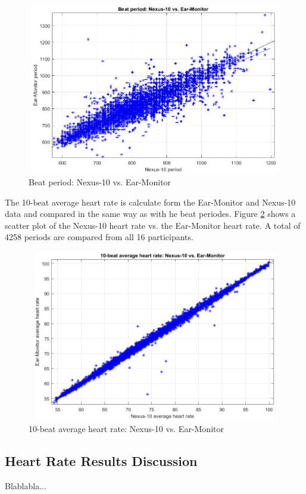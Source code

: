 \begin{figure}[H]
   \centering
   \includegraphics[width=12cm,height=7.5cm]{figs/PeriodScatter.png}
   \caption{Beat period: Nexus-10 vs. Ear-Monitor}
   \label{fig:PeriodScatter}
\end{figure}

The 10-beat average heart rate is calculate form the Ear-Monitor and Nexus-10 data and compared in the same way as with he beat periodes. Figure \ref{fig:HeartRateScatter} shows a scatter plot of the Nexus-10 heart rate vs. the Ear-Monitor heart rate. A total of 4258 periods are compared from all 16 participants.

\begin{figure}[H]
   \centering
   \includegraphics[width=12cm,height=7.5cm]{figs/HeartRateScatter.png}
   \caption{10-beat average heart rate: Nexus-10 vs. Ear-Monitor}
   \label{fig:HeartRateScatter}
\end{figure}

\subsection{Heart Rate Results Discussion}
Blablabla...


